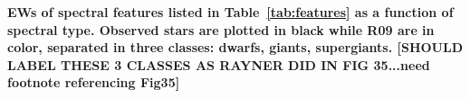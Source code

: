 {\bf EWs of spectral features listed in Table~\ref{tab:features} as a function of spectral type.  Observed stars are plotted in black while R09 are in color, separated in three classes: dwarfs, giants, supergiants. [SHOULD LABEL THESE 3 CLASSES AS RAYNER DID IN FIG 35...need footnote referencing Fig35]\label{fig:EW-obs-R09}}